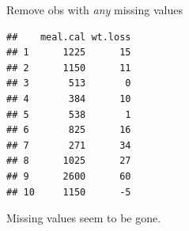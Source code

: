 \documentclass[ignorenonframetext,]{beamer}
\newenvironment{Shaded}{\begin{snugshade}}{\end{snugshade}}
\newcommand{\DecValTok}[1]{\textcolor[rgb]{0.00,0.00,0.81}{#1}}
\newcommand{\KeywordTok}[1]{\textcolor[rgb]{0.13,0.29,0.53}{\textbf{#1}}}
\newcommand{\NormalTok}[1]{#1}
\newcommand{\OperatorTok}[1]{\textcolor[rgb]{0.81,0.36,0.00}{\textbf{#1}}}
\newcommand{\StringTok}[1]{\textcolor[rgb]{0.31,0.60,0.02}{#1}}
\begin{document}
\begin{frame}[fragile]{Remove obs with \emph{any} missing values}
\protect\hypertarget{remove-obs-with-any-missing-values}{}

\small

\begin{Shaded}
\end{Shaded}

\begin{verbatim}
##    meal.cal wt.loss
## 1      1225      15
## 2      1150      11
## 3       513       0
## 4       384      10
## 5       538       1
## 6       825      16
## 7       271      34
## 8      1025      27
## 9      2600      60
## 10     1150      -5
\end{verbatim}

\normalsize

Missing values seem to be gone.

\end{frame}
\end{document}
